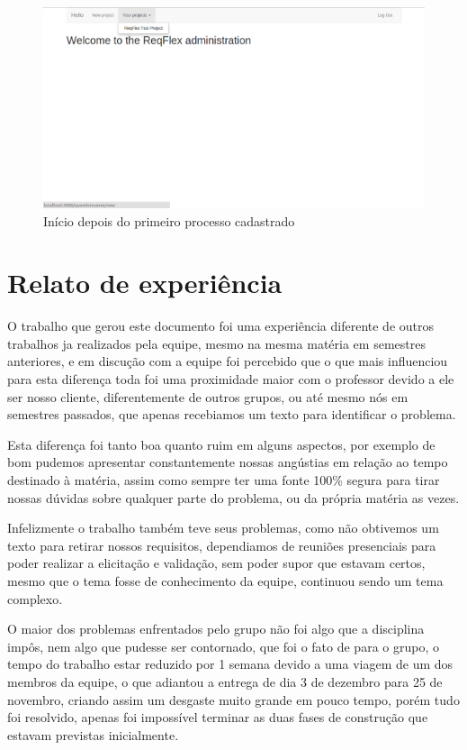 \begin{figure}[H]
	\centering
	\includegraphics[scale=0.3]{imgFerramenta/primeiraPaginaDepois}
	\caption{Início depois do primeiro processo cadastrado}
	\label{img:primeira_pag_dps}
\end{figure}

\chapter{Relato de experiência}

O trabalho que gerou este documento foi uma experiência diferente de outros trabalhos ja realizados pela equipe, mesmo na mesma matéria em semestres anteriores, e em discução com a equipe foi percebido que o que mais influenciou para esta diferença toda foi uma proximidade maior com o professor devido a ele ser nosso cliente, diferentemente de outros grupos, ou até mesmo nós em semestres passados, que apenas recebiamos um texto para identificar o problema.

Esta diferença foi tanto boa quanto ruim em alguns aspectos, por exemplo de bom pudemos apresentar constantemente nossas angústias em relação ao tempo destinado à matéria, assim como sempre ter uma fonte 100\% segura para tirar nossas dúvidas sobre qualquer parte do problema, ou da própria matéria as vezes.

Infelizmente o trabalho também teve seus problemas, como não obtivemos um texto para retirar nossos requisitos, dependiamos de reuniões presenciais para poder realizar a elicitação e validação, sem poder supor que estavam certos, mesmo que o tema fosse de conhecimento da equipe, continuou sendo um tema complexo.

O maior dos problemas enfrentados pelo grupo não foi algo que a disciplina impôs, nem algo que pudesse ser contornado, que foi o fato de para o grupo, o tempo do trabalho estar reduzido por 1 semana devido a uma viagem de um dos membros da equipe, o que adiantou a entrega de dia 3 de dezembro para 25 de novembro, criando assim um desgaste muito grande em pouco tempo, porém tudo foi resolvido, apenas foi impossível terminar as duas fases de construção que estavam previstas inicialmente.

